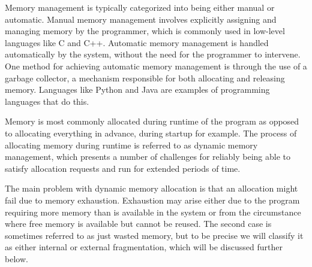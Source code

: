 
Memory management is typically categorized into being either manual or automatic. Manual memory management involves explicitly assigning and managing memory by the programmer, which is commonly used in low-level languages like C and C++. Automatic memory management is handled automatically by the system, without the need for the programmer to intervene. One method for achieving automatic memory management is through the use of a garbage collector, a mechanism responsible for both allocating and releasing memory. Languages like Python and Java are examples of programming languages that do this.

Memory is most commonly allocated during runtime of the program as opposed to allocating everything in advance, during startup for example. The process of allocating memory during runtime is referred to as dynamic memory management, which presents a number of challenges for reliably being able to satisfy allocation requests and run for extended periods of time.

The main problem with dynamic memory allocation is that an allocation might fail due to memory exhaustion. Exhaustion may arise either due to the program requiring more memory than is available in the system or from the circumstance where free memory is available but cannot be reused. The second case is sometimes referred to as just wasted memory, but to be precise we will classify it as either internal or external fragmentation, which will be discussed further below.


